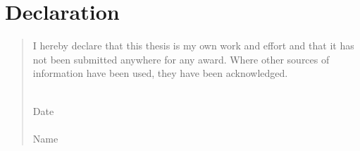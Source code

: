 \chapter*{Declaration}
\begin{quote}

\vspace*{3cm}

I hereby declare that this thesis is my own work and effort and that it has not been submitted anywhere for any award. Where other sources of information have been used, they have been acknowledged.

\vspace*{2cm}

\begin{flushright}
\underline{\hspace{4cm}}\\
Date\\
\vspace*{1cm}
\underline{\hspace{4cm}}\\
Name
\end{flushright}

\end{quote}

